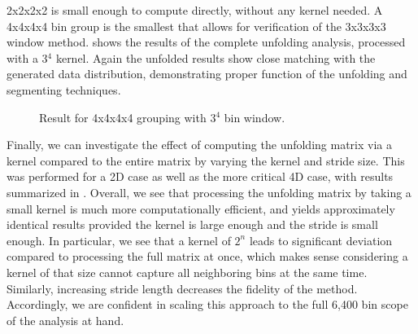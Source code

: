         2x2x2x2 is small enough to compute directly, without any kernel needed. A 4x4x4x4 bin group is the smallest that allows for verification of the 3x3x3x3 window method.  shows the results of the complete unfolding analysis, processed with a 3$^4$ kernel. Again the unfolded results show close matching with the generated data distribution, demonstrating proper function of the unfolding and segmenting techniques.
    
        \begin{figure}[H]
            \centering
            \hfill
            \caption[4x4x4x4 IBU Result]{ Result for 4x4x4x4 grouping with 3$^4$ bin window.}\label{fig:4x4unfold}
        \end{figure}

        Finally, we can investigate the effect of computing the unfolding matrix via a kernel compared to the entire matrix by varying the kernel and stride size. This was performed for a 2D case as well as the more critical 4D case, with results summarized in . Overall, we see that processing the unfolding matrix by taking a small kernel is much more computationally efficient, and yields approximately identical results provided the kernel is large enough and the stride is small enough. In particular, we see that a kernel of $2^n$ leads to significant deviation compared to processing the full matrix at once, which makes sense considering a kernel of that size cannot capture all neighboring bins at the same time. Similarly, increasing stride length decreases the fidelity of the method. Accordingly, we are confident in scaling this approach to the full 6,400 bin scope of the analysis at hand. 
    

